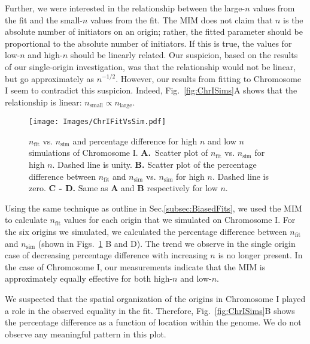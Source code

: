 	Further, we were interested in the relationship between the large-$n$ values from the fit and the small-$n$ values from the fit.
	The MIM does not claim that $n$ is the absolute number of initiators on an origin; rather, the fitted parameter should be proportional to the absolute number of initiators.
	If this is true, the values for low-$n$ and high-$n$ should be linearly related.
	Our suspicion, based on the results of our single-origin investigation, was that the relationship would not be linear, but go approximately as $n^{-1/2}$.
	However, our results from fitting to Chromosome I seem to contradict this suspicion.
	Indeed, Fig.~\ref{fig:ChrISims}A shows that the relationship is linear: $n_\text{small} \propto n_\text{large}$.
		
	\begin{figure}[tbh!]
		\begin{center}
			\texttt{[image: Images/ChrIFitVsSim.pdf]}
		\end{center}
			\caption[Chromosome I $n_\text{fit}$ vs. $n_\text{sim}$ and Percentage Difference]{\label{fig:ChrIFitVsSim}
				$n_\text{fit}$ vs. $n_\text{sim}$ and percentage difference for high $n$ and low $n$ simulations of Chromosome I.
				\textbf{A.}~Scatter plot of $n_\text{fit}$ vs. $n_\text{sim}$ for high $n$.
				Dashed line is unity.
				\textbf{B.}  Scatter plot of the percentage difference between $n_\text{fit}$ and $n_\text{sim}$ vs. $n_\text{sim}$ for high $n$.
				Dashed line is zero.
				\textbf{C - D.} Same as \textbf{A} and \textbf{B} respectively for low $n$.
			}
	\end{figure} 
	
	Using the same technique as outline in Sec.\ref{subsec:BiasedFits}, we used the MIM to calculate $n_\text{fit}$ values for each origin that we simulated on Chromosome I.
	For the six origins we simulated, we calculated the percentage difference between $n_\text{fit}$ and $n_\text{sim}$ (shown in Figs.~\ref{fig:ChrIFitVsSim} B and D).
	The trend we observe in the single origin case of decreasing percentage difference with increasing $n$ is no longer present.
	In the case of Chromosome I, our measurements indicate that the MIM is approximately equally effective for both high-$n$ and low-$n$.
	
	We suspected that the spatial organization of the origins in Chromosome I played a role in the observed equality in the fit.
	Therefore, Fig.~\ref{fig:ChrISims}B shows the percentage difference as a function of location within the genome.
	We do not observe any meaningful pattern in this plot.
	
